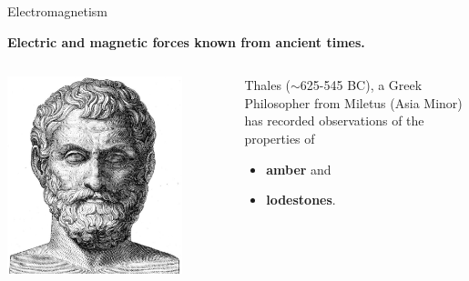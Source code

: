 \begin{frame}{Electromagnetism}

\begin{center}
 {\bf Electric and magnetic forces known from ancient times.}\\
\end{center}

\begin{columns}
  \begin{column}{0.40\textwidth}
   \begin{center}
      \includegraphics[width=0.80\textwidth]{./images/people/thales.jpg}\\
   \end{center}
  \end{column}
  \begin{column}{0.60\textwidth}
     Thales ($\sim$625-545 BC), a Greek Philosopher from Miletus (Asia Minor)
     has recorded observations of the properties of
     \begin{itemize}
       \item {\bf amber} and
       \item {\bf lodestones}.
     \end{itemize}
  \end{column}
\end{columns}

\end{frame}

%
%
%


